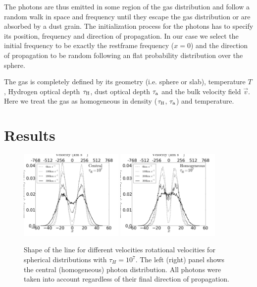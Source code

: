 \documentclass{emulateapj}
\newcommand{\ly}{{\ifmmode{{\rm Ly}\alpha~}\else{Ly$\alpha$~}\fi}}
\begin{document}
The photons are thus emitted in some region of the gas distribution
and follow a random walk in space and frequency until they escape the
gas distribution or are absorbed by a dust grain. The initialization
process for the \ly photons has to specify its position, frequency and
direction of propagation. In our case we select the initial frequency
to be exactly the \ly restframe frequency ($x=0$) and the direction of
propagation to be random following an flat probability distribution
over the sphere. 


The gas is completely defined by its geometry (i.e. sphere or slab),
temperature $T$, Hydrogen optical depth $\tau_{\rm H}$, dust optical
depth $\tau_{\rm a}$ and the bulk velocity field $\vec{v}$.  Here we
treat the gas as homogeneous in density ($\tau_{\rm H}$, $\tau_{\rm
  a}$) and temperature. 





\section{Results}
\label{sec:results}

\begin{figure}
\begin{center}
  \includegraphics[width=0.45\textwidth]{SpectraDifVelocitiesCentral.png}
  \includegraphics[width=0.45\textwidth]{SpectraDifVelocitiesHOM.png}
\end{center}
\caption{Shape of the \ly line for
    different velocities rotational velocities for spherical
    distributions with $\tau_{H}=10^{7}$. The left (right) panel shows
    the central (homogeneous) photon distribution. All photons were
    taken into  account regardless of their final direction of propagation.
    \label{fig:differentvelocities}}  
\end{figure}
\end{document}
